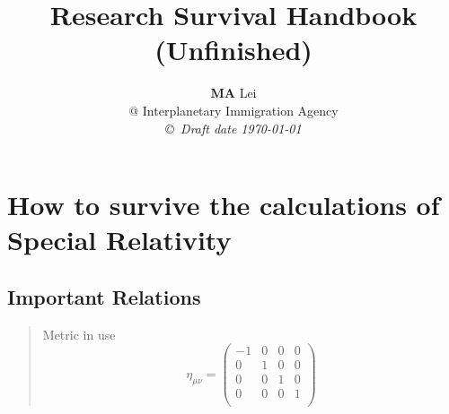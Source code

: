 \documentclass[12pt,a4paper]{book}
\begin{document}
\title{Research Survival Handbook \\ (\textbf{Unfinished})}
\author{{\bf MA} Lei  \\
@ Interplanetary Immigration Agency \\
{\small\em \copyright \ Draft date \today}}
\date{}
\maketitle


\newcommand{\dd}{\mathrm d}
\newenvironment{eqnset}
{\begin{equation}\left \bracevert \begin{array}{l}}
{\end{array} \right. \end{equation}}

\newenvironment{eqn}
{\begin{equation}\left \bracevert \begin{array}{l}}
{\end{array} \right. \end{equation}}


























\section{How to survive the calculations of Special Relativity}

\subsection{Important Relations}
\begin{quotation}
Metric in use
\begin{equation}\eta_{\mu\nu}=\left(\begin{matrix}
	-1 & 0 & 0 & 0\\
	0 & 1 & 0 & 0\\
	0 & 0 & 1 & 0\\
	0 & 0 & 0 & 1\\
\end{matrix}\right)\end{equation}
\end{quotation}
\end{document}
